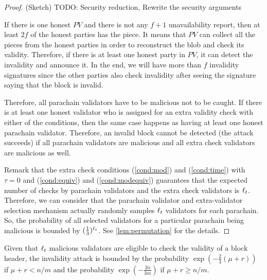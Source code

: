 \begin{proof}(Sketch)
TODO: Security reduction, Rewrite the security arguments


If there is one honest $PV$ and there is not any $f+1$ unavailability report, then at least $2f$ of the honest parties has the piece. It means that $PV$ can collect all the pieces from the honest parties in order to reconstruct the blob and check its validity. Therefore, if there is at least one honest party in $PV$, it can detect the invalidity and announce it. In the end, we will have more than $f$ invalidity signatures since the other parties also check invalidity after seeing the signature saying that the block is invalid.

Therefore, all parachain validators have to be malicious not to be caught. 
If there is at least one honest validator who is assigned for an extra validity check with either of the conditions, then the same case happens as having at least one honest parachain validator. Therefore, an invalid block cannot be detected (the attack succeeds) if all parachain validators are malicious and all extra check validators are malicious as well. 

Remark that the extra check conditions (\ref{cond:mod}) and (\ref{cond:time})  with $\tau = 0$ and (\ref{cond:equiv}) and (\ref{cond:modequiv}) guarantees that the expected number of checks by parachain validators and the extra check validators is $\ell_t$. %
Therefore, we can consider that the parachain validator and extra-validator selection mechanism actually randomly samples $\ell_t$ validators for each parachain. So, the probability of all selected validators for a particular parachain being malicious is bounded by $(\frac{1}{3})^{\ell_t}$. See \ref{lem:permutation} for the details.

\end{proof}



\begin{theorem}\label{thm:vcheckmal}
Given that $\ell_t$ malicious validators are eligible to check the validity of a block header, the invalidity attack is bounded by the probability  $\exp(-\frac{2}{3}(\mu+r))$ if $\mu + r < n/m$ and the probability $\exp(-\frac{2n}{3m})$ if $\mu + r \geq n/m$.
\end{theorem}

